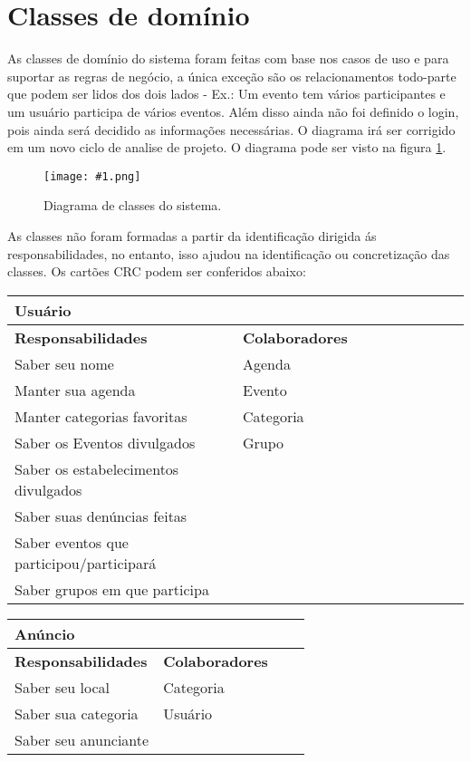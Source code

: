 \documentclass{article}
\newcommand{\diagrama}[2]
{
 \begin{figure}[H]
 \begin{center}
 \texttt{[image: \#1.png]}
 \end{center}
 \caption{#2}
 \label{fig:#1}
 \end{figure}
}
\begin{document}
	\section{Classes de domínio} \bigskip
As classes de domínio do sistema foram feitas com base nos casos de uso e para suportar as regras de negócio, a única exceção são os relacionamentos todo-parte que podem ser lidos dos dois lados - Ex.: Um evento tem vários participantes e um usuário participa de vários eventos. Além disso ainda não foi definido o login, pois ainda será decidido as informações necessárias. O diagrama irá ser corrigido em um novo ciclo de analise de projeto. O diagrama pode ser visto na figura \ref{fig:Diagrama}.
 
\diagrama{Diagrama}{Diagrama de classes do sistema.} 

\pagebreak

As classes não foram formadas a partir da identificação dirigida ás responsabilidades, no entanto, isso ajudou na identificação ou concretização das classes. Os cartões CRC podem ser conferidos abaixo:

\begin{center}
 \begin{tabular}{|p{0.5\linewidth}|p{0.5\linewidth}|}
  \hline
  \multicolumn{2}{|p{\textwidth}|}{
   {\large \textbf{Usuário}}} \\
  \hline
  \textbf{Responsabilidades} & \textbf{Colaboradores} \\ 
  \hline
  Saber seu nome &  Agenda \\
  \hline
  Manter sua agenda & Evento \\
  \hline
  Manter categorias favoritas & Categoria \\
  \hline
  Saber os Eventos divulgados & Grupo  \\
  \hline
  Saber os estabelecimentos divulgados &  \\
  \hline
  Saber suas denúncias feitas &  \\
  \hline
  Saber eventos que participou/participará &  \\
  \hline
  Saber grupos em que participa & \\  
  \hline
 \end{tabular} 
\end{center}
    
    
    \begin{center}
   	 \begin{tabular}{|p{0.5\linewidth}|p{0.5\linewidth}|}
\hline
 	\multicolumn{2}{|p{\textwidth}|}{
{\large \textbf{Anúncio}}
}  \\
\hline
\textbf{Responsabilidades} & \textbf{Colaboradores} \\ 
\hline
  	Saber seu local & Categoria  \\
  	\hline
  	Saber sua categoria & Usuário \\
  	\hline
  	Saber seu anunciante &  \\
  	\hline
   	\end{tabular} 
    \end{center}
    
\end{document}
